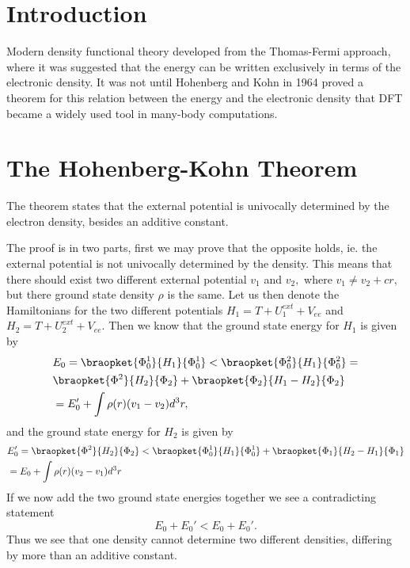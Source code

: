 \documentclass[a4paper,10pt,english]{article}%
\begin{document}
\section{Introduction}
Modern density functional theory developed from the Thomas-Fermi approach, where
it was suggested that the energy can be written exclusively in terms of the 
electronic density. It was not until Hohenberg and Kohn in 1964 proved a theorem
for this relation between the energy and the electronic density that DFT became
a widely used tool in many-body computations.

\section{The Hohenberg-Kohn Theorem}
The theorem states that the external potential is univocally determined by the 
electron density, besides an additive constant.

The proof is in two parts, first we may prove that the opposite holds, ie. the
external potential is not univocally determined by the density. This means that
there should exist two different external potential $v_1$ and $v_2,$ where
$v_1\neq v_2 +cr,$ but there ground state density $\rho$ is the same. Let us
then denote the Hamiltonians for the two different potentials $H_1=T+U^{ext}_1+V_{ee}$ and $H_2=T+U^{ext}_2+V_{ee}.$ Then we know that the ground state
energy for $H_1$ is given by 
\begin{equation*}
        \begin{split}
                &E_0=\braopket{\Phi^1_0}{H_1}{\Phi^1_{0}}<\braopket{\Phi^2_0}{H_1}{\Phi^2_0}=\\
                &\braopket{\Phi^2}{H_2}{\Phi_2}+\braopket{\Phi_2}{H_1-H_2}{\Phi_2}\\
                &=E_0'+\int\rho(r)(v_1-v_2)d^3r,
        \end{split}
\end{equation*}
 and the ground state energy for $H_2$ is given by
\begin{equation*}
        \begin{split}
                &E_0'=\braopket{\Phi^2}{H_2}{\Phi_2}<\braopket{\Phi^1_0}{H_1}{\Phi^1_{0}}+\braopket{\Phi_1}{H_2-H_1}{\Phi_1}\\
                &=E_0+\int\rho(r)(v_2-v_1)d^3r
        \end{split}
        \label{sc1eq:1}
\end{equation*}
If we now add the two ground state energies together we see a contradicting 
statement
\begin{equation*}
       E_0+E_0'<E_0+E_0'.
        \label{sqeq:contr}
\end{equation*}
Thus we see that one density cannot determine two different densities, differing
by more than an additive constant.\\
\end{document}
